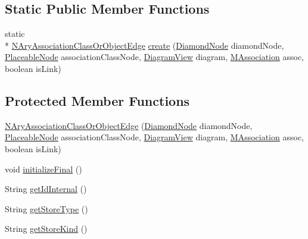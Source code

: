 \subsection*{Static Public Member Functions}
\begin{DoxyCompactItemize}
\item 
static \\*
\hyperlink{classorg_1_1tzi_1_1use_1_1gui_1_1views_1_1diagrams_1_1elements_1_1edges_1_1_n_ary_association_class_or_object_edge}{N\-Ary\-Association\-Class\-Or\-Object\-Edge} \hyperlink{classorg_1_1tzi_1_1use_1_1gui_1_1views_1_1diagrams_1_1elements_1_1edges_1_1_n_ary_association_class_or_object_edge_ab077de7dcfad73935646ebc299888d67}{create} (\hyperlink{classorg_1_1tzi_1_1use_1_1gui_1_1views_1_1diagrams_1_1elements_1_1_diamond_node}{Diamond\-Node} diamond\-Node, \hyperlink{classorg_1_1tzi_1_1use_1_1gui_1_1views_1_1diagrams_1_1elements_1_1_placeable_node}{Placeable\-Node} association\-Class\-Node, \hyperlink{classorg_1_1tzi_1_1use_1_1gui_1_1views_1_1diagrams_1_1_diagram_view}{Diagram\-View} diagram, \hyperlink{interfaceorg_1_1tzi_1_1use_1_1uml_1_1mm_1_1_m_association}{M\-Association} assoc, boolean is\-Link)
\end{DoxyCompactItemize}
\subsection*{Protected Member Functions}
\begin{DoxyCompactItemize}
\item 
\hyperlink{classorg_1_1tzi_1_1use_1_1gui_1_1views_1_1diagrams_1_1elements_1_1edges_1_1_n_ary_association_class_or_object_edge_a0032fa5f21e01065623dca41eab3512c}{N\-Ary\-Association\-Class\-Or\-Object\-Edge} (\hyperlink{classorg_1_1tzi_1_1use_1_1gui_1_1views_1_1diagrams_1_1elements_1_1_diamond_node}{Diamond\-Node} diamond\-Node, \hyperlink{classorg_1_1tzi_1_1use_1_1gui_1_1views_1_1diagrams_1_1elements_1_1_placeable_node}{Placeable\-Node} association\-Class\-Node, \hyperlink{classorg_1_1tzi_1_1use_1_1gui_1_1views_1_1diagrams_1_1_diagram_view}{Diagram\-View} diagram, \hyperlink{interfaceorg_1_1tzi_1_1use_1_1uml_1_1mm_1_1_m_association}{M\-Association} assoc, boolean is\-Link)
\item 
void \hyperlink{classorg_1_1tzi_1_1use_1_1gui_1_1views_1_1diagrams_1_1elements_1_1edges_1_1_n_ary_association_class_or_object_edge_afb59afe67f296010251bec7e39eff71b}{initialize\-Final} ()
\item 
String \hyperlink{classorg_1_1tzi_1_1use_1_1gui_1_1views_1_1diagrams_1_1elements_1_1edges_1_1_n_ary_association_class_or_object_edge_aefcafa7a127d5a539814aea3e15ce289}{get\-Id\-Internal} ()
\item 
String \hyperlink{classorg_1_1tzi_1_1use_1_1gui_1_1views_1_1diagrams_1_1elements_1_1edges_1_1_n_ary_association_class_or_object_edge_a4a10f6fc8b26023bd09f1624c33bd46a}{get\-Store\-Type} ()
\item 
String \hyperlink{classorg_1_1tzi_1_1use_1_1gui_1_1views_1_1diagrams_1_1elements_1_1edges_1_1_n_ary_association_class_or_object_edge_adea70aa13ce249420ce99aa69cea0123}{get\-Store\-Kind} ()
\end{DoxyCompactItemize}
